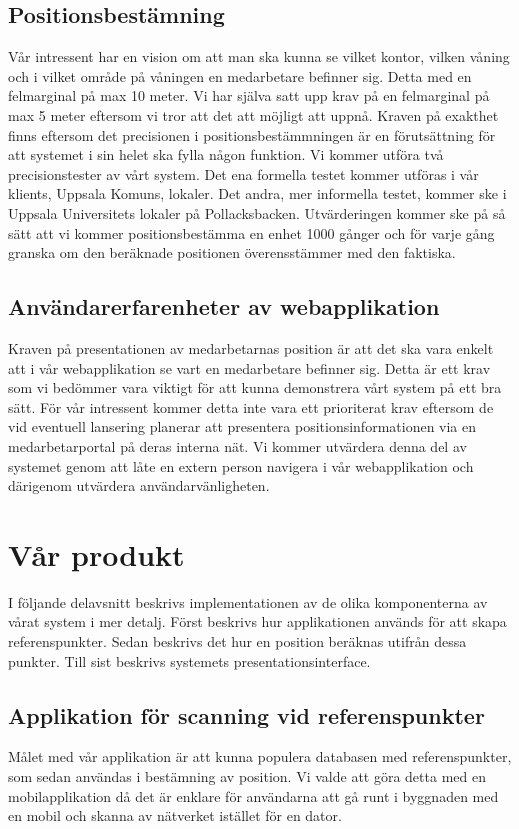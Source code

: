 \documentclass[swedish, a4paper,12pt]{article}
\begin{document}
\subsection{Positionsbestämning}
Vår intressent har en vision om att man ska kunna se vilket kontor, vilken våning och i vilket område på våningen en medarbetare befinner sig. Detta med en felmarginal på max 10 meter. Vi har själva satt upp krav på en felmarginal på max 5 meter eftersom vi tror att det att möjligt att uppnå. Kraven på exakthet finns eftersom det precisionen i positionsbestämmningen är en förutsättning för att systemet i sin helet ska fylla någon funktion. Vi kommer utföra två precisionstester av vårt system. Det ena formella testet kommer utföras i vår klients, Uppsala Komuns, lokaler. Det andra, mer informella testet, kommer ske i Uppsala Universitets lokaler på Pollacksbacken. Utvärderingen kommer ske på så sätt att vi kommer positionsbestämma en enhet 1000 gånger och för varje gång granska om den beräknade positionen överensstämmer med den faktiska.

\subsection{Användarerfarenheter av webapplikation}
Kraven på presentationen av medarbetarnas position är att det ska vara enkelt att i vår webapplikation se vart en medarbetare befinner sig. Detta är ett krav som vi bedömmer vara viktigt för att kunna demonstrera vårt system på ett bra sätt. För vår intressent kommer detta inte vara ett prioriterat krav eftersom de vid eventuell lansering planerar att presentera positionsinformationen via en medarbetarportal på deras interna nät. Vi kommer utvärdera denna del av systemet genom att låte en extern person navigera i vår webapplikation och därigenom utvärdera användarvänligheten.

\section{Vår produkt}
I följande delavsnitt beskrivs implementationen av de olika komponenterna av vårat system i mer detalj. Först beskrivs hur applikationen används för att skapa referenspunkter. Sedan beskrivs det hur en position beräknas utifrån dessa punkter. Till sist beskrivs systemets presentationsinterface.

\subsection{Applikation för scanning vid referenspunkter}
Målet med vår applikation är att kunna populera databasen med referenspunkter, som sedan användas i bestämning av position. Vi valde att göra detta med en mobilapplikation då det är enklare för användarna att gå runt i byggnaden med en mobil och skanna av nätverket istället för en dator.
\end{document}
